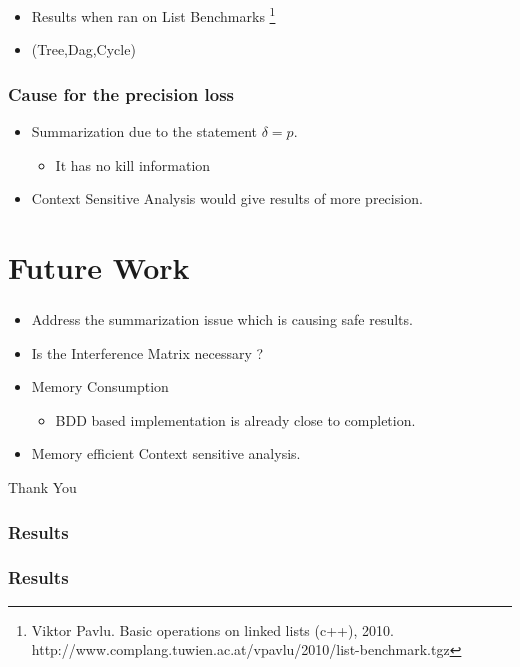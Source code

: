 \documentclass[mathserif,10pt]{beamer}
\newcommand{\cmt}[1]{}
\begin{document}
\frame
{
  \frametitle{\subsecname}
  \begin{itemize}
 \item Results when ran on List Benchmarks \footnote{Viktor Pavlu. Basic operations on linked lists (c++), 2010.
http://www.complang.tuwien.ac.at/vpavlu/2010/list-benchmark.tgz} 
 \item   (Tree,Dag,Cycle)
\end{itemize}

  
}

\frame
{
  \frametitle{\subsecname}
  
}


\frame
{
  \frametitle{Cause for the precision loss}
  \begin{itemize}
   \item Summarization due to the statement $\delta = p$. 
    \begin{itemize}
     \item It has no kill information
    \end{itemize}
   \item Context Sensitive Analysis would give results of more precision.   
  \end{itemize}

}

\section{Future Work}

\frame
{
\frametitle{\secname}
\begin{itemize}
 \item Address the summarization issue which is causing safe results. \pause
 \item Is the Interference Matrix necessary ? \pause
 \item Memory Consumption
      \begin{itemize}
       \item BDD based implementation is already close to completion. \pause
      \end{itemize} 
 \item Memory efficient Context sensitive analysis.  
\end{itemize}
}

\cmt{A Binary Decision Diagram library, with :many highly efficient vectorized BDD operations,
dynamic variable reordering,automated garbage collection,a C++ interface with 
automatic reference counting,and much more.}


\frame
{
	\begin{center}
	\Huge{\blue Thank You}
	\end{center}
}


\frame
{
  \frametitle{Results}
  	
}

\frame
{
  \frametitle{Results}
  
}
\end{document}
